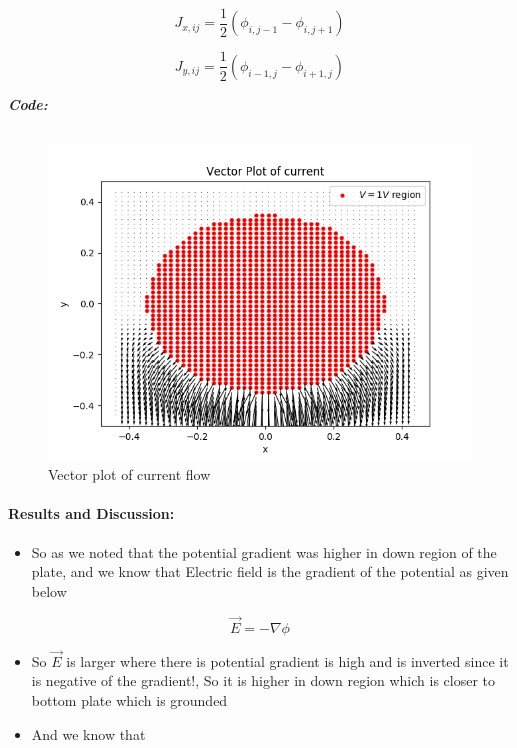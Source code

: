 \documentclass[11pt, a4paper, twoside]{article}
\begin{document}
\begin{equation}
        J_{x,ij} = \frac{1}{2}(\phi_{i,j-1} - \phi_{i,j+1}) 
    \end{equation}

\begin{equation}
        J_{y,ij} = \frac{1}{2}(\phi_{i-1,j} - \phi_{i+1,j}) 
    \end{equation}
  
  \textit{\textbf{Code:}}
  \inputminted[linenos, breaklines]{python}{Code/6.py}
  \begin{figure}[!tbh]
   \centering
   \includegraphics[scale=0.8]{Plots/Fig7.png}  
   \caption{Vector plot of current flow}
  \end{figure}

  
  \paragraph{Results and Discussion:}\label{results-and-discussion6}

  \begin{itemize}
  \item
    So as we noted that the potential gradient was higher in down region
    of the plate, and we know that Electric field is the gradient of the
    potential as given below
  \end{itemize}
  
  \begin{equation}
  \vec{E} = -\nabla{\phi}
     \end{equation}
  
  \begin{itemize}
  \item
    So \(\vec{E}\) is larger where there is potential gradient is high and
    is inverted since it is negative of the gradient!, So it is higher in
    down region which is closer to bottom plate which is grounded
  \item
    And we know that
  \end{itemize}
  
\end{document}
